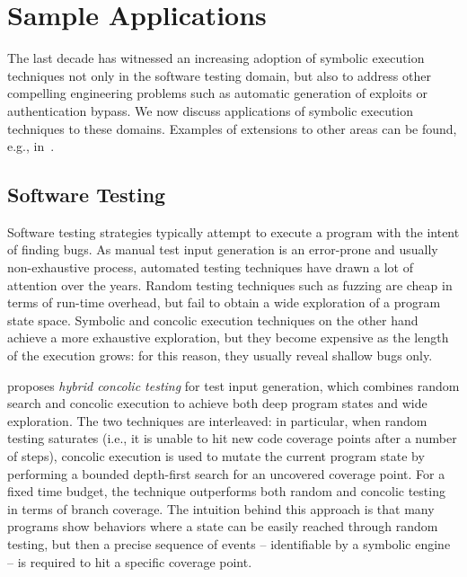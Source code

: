 
\section{Sample Applications}
\label{se:applications}

The last decade has witnessed an increasing adoption of symbolic execution techniques not only in the software testing domain, but also to address other compelling engineering problems such as automatic generation of exploits or authentication bypass. We now discuss  applications of symbolic execution techniques to these domains. Examples of extensions to other areas can be found, e.g., in~\cite{CGK-ICSE11}.


\subsection{Software Testing}%
\label{ss:bug-detection}

Software testing strategies typically attempt to execute a program with the intent of finding bugs. As manual test input generation is an error-prone and usually non-exhaustive process, automated testing techniques have drawn a lot of attention over the years. Random testing techniques such as fuzzing are cheap in terms of run-time overhead, but fail to obtain a wide exploration of a program state space. Symbolic and concolic execution techniques on the other hand achieve a more exhaustive exploration, but they become expensive as the length of the execution grows: for this reason, they usually reveal shallow bugs only.

\cite{RK-ICSE07} proposes {\em hybrid concolic testing} for test input generation, which combines random search and concolic execution to achieve both deep program states and wide exploration. The two techniques are interleaved: in particular, when random testing saturates (i.e., it is unable to hit new code coverage points after a number of steps), concolic execution is used to mutate the current program state by performing a bounded depth-first search for an uncovered coverage point. For a fixed time budget, the technique outperforms both random and concolic testing in terms of branch coverage. The intuition behind this approach is that many programs show behaviors where a state can be easily reached through random testing, but then a precise sequence of events -- identifiable by a symbolic engine -- is required to hit a specific coverage point.


